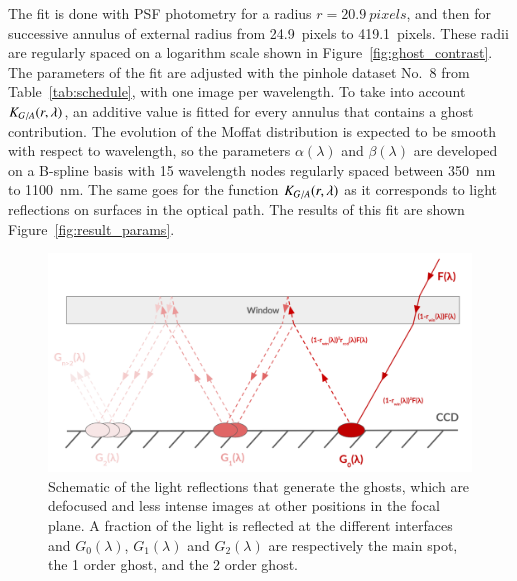 The fit is done with PSF photometry for a radius $r=\SI{20.9}{pixels}$, and then for successive annulus of external radius from \SI{24.9}{pixels} to \SI{419.1}{pixels}. These radii are regularly spaced on a logarithm scale shown in Figure~\ref{fig:ghost_contrast}. The parameters of the fit are adjusted with the \spinhole pinhole dataset No.~8 from Table~\ref{tab:schedule}, with one image per wavelength. To take into account $K_{G/A}(r, \lambda)$, an additive value is fitted for every annulus that contains a ghost contribution. The evolution of the Moffat distribution is expected to be smooth with respect to wavelength, so the parameters $\alpha(\lambda)$ and $\beta(\lambda)$ are developed on a B-spline basis with 15 wavelength nodes regularly spaced between \SI{350}{\nano\meter} to \SI{1100}{\nano\meter}. The same goes for the function $K_{G/A}(r, \lambda)$ as it corresponds to light reflections on surfaces in the optical path. The results of this fit are shown Figure~\ref{fig:result_params}. 

\begin{figure}[h]
    \centering
    \includegraphics[width=\columnwidth]{fig/schema_ghost.pdf}
    \caption{Schematic of the light reflections that generate the ghosts, which are defocused and less intense images at other positions in the focal plane. A fraction of the light is reflected at the different interfaces and $G_0(\lambda)$, $G_1(\lambda)$ and $G_2(\lambda)$ are respectively the main spot, the 1 order ghost, and the 2 order ghost.}
    \label{fig:schema_ghost}
\end{figure}

